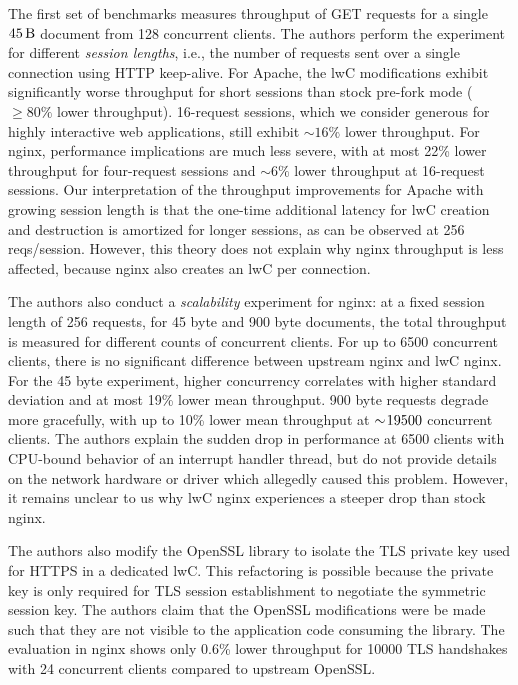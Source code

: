 \documentclass[10pt,twocolumn,a4paper]{article}
\begin{document}
The first set of benchmarks measures throughput of GET requests for a single $\SI{45}{\byte}$ document from 128 concurrent clients.
The authors perform the experiment for different \textit{session lengths}, i.e., the number of requests sent over a single connection using HTTP keep-alive.
For Apache, the lwC modifications exhibit significantly worse throughput for short sessions than stock pre-fork mode ($\ge80\%$ lower throughput).
16-request sessions, which we consider generous for highly interactive web applications, still exhibit $\sim 16\%$ lower throughput.
For nginx, performance implications are much less severe, with at most 22\% lower throughput for four-request sessions and $\sim 6\%$ lower throughput at 16-request sessions.
\cite{lwcpaper}
Our interpretation of the throughput improvements for Apache with growing session length is that the one-time additional latency for lwC creation and destruction is amortized for longer sessions, as can be observed at 256 reqs/session.
However, this theory does not explain why nginx throughput is less affected, because nginx also creates an lwC per connection.

The authors also conduct a \textit{scalability} experiment for nginx:
at a fixed session length of 256 requests, for 45 byte and 900 byte documents, the total throughput is measured for different counts of concurrent clients.
For up to 6500 concurrent clients, there is no significant difference between upstream nginx and lwC nginx.
For the 45 byte experiment, higher concurrency correlates with higher standard deviation and at most 19\% lower mean throughput.
900 byte requests degrade more gracefully, with up to 10\% lower mean throughput at $\sim\hspace{-2pt}19500$ concurrent clients.
The authors explain the sudden drop in performance at 6500 clients with CPU-bound behavior of an interrupt handler thread, but do not provide details on the network hardware or driver which allegedly caused this problem.
\cite{lwcpaper}
However, it remains unclear to us why lwC nginx experiences a steeper drop than stock nginx.

The authors also modify the OpenSSL library to isolate the TLS private key used for HTTPS in a dedicated lwC.
This refactoring is possible because the private key is only required for TLS session establishment to negotiate the symmetric session key.
The authors claim that the OpenSSL modifications were be made such that they are not visible to the application code consuming the library.
The evaluation in nginx shows only 0.6\% lower throughput for 10000 TLS handshakes with 24 concurrent clients compared to upstream OpenSSL.
\cite{lwcpaper}
\end{document}

